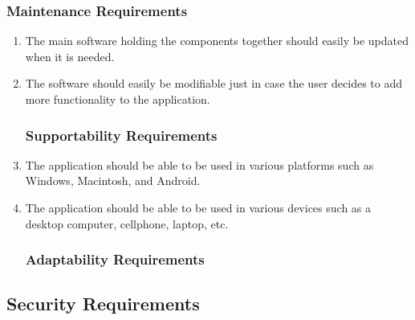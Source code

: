 \documentclass[]{article}
\begin{document}
\subsubsection{Maintenance Requirements}
\label{ssub:maintenance_requirements}
\begin{enumerate}[{MS}1. ]
	\item The main software holding the components together should easily be updated when it is needed.
	\item The software should easily be modifiable just in case the user decides to add more functionality to the application.


\subsubsection{Supportability Requirements}
\label{ssub:supportability_requirements}
	\item The application should be able to be used in various platforms such as Windows, Macintosh, and Android.
	\item The application should be able to be used in various devices such as a desktop computer, cellphone, laptop, etc.

\subsubsection{Adaptability Requirements}
\label{ssub:adaptability_requirements}

\end{enumerate}


\subsection{Security Requirements}
\label{sub:security_requirements}
\end{document}

